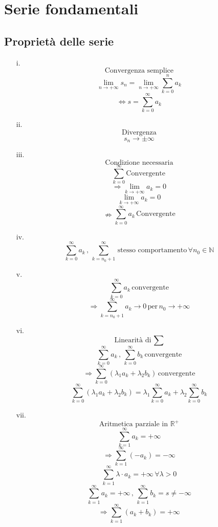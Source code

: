 \documentclass[a4paper,12pt]{report}
\theoremstyle{mystyle}
\begin{document}
\section{Serie fondamentali}

\subsection{Proprietà delle serie}

\begin{enumerate}
    \item[i.] \[\text{Convergenza semplice}\]
        \[\lim_{n \rightarrow +\infty} s_n = \lim_{n \rightarrow +\infty} \sum_{k=0}^n a_k \]
        \[\Leftrightarrow s = \sum_{k=0}^\infty a_k \]

    \item[ii.] \[\text{Divergenza}\]
        \[s_n \rightarrow \pm \infty \]

    \item[iii.] \[\text{Condizione necessaria}\]
        \[\sum_{k=0}^\infty \,\text{Convergente} \]
        \[\Rightarrow \lim_{k \rightarrow +\infty} a_k =0 \]
        \[\lim_{k \rightarrow +\infty} a_k =0 \]
        \[\nRightarrow \sum_{k=0}^\infty a_k \,\text{Convergente}\]

    \item[iv.]
        \[\sum_{k=0}^\infty a_k \,,\, \sum_{k=n_0+1}^\infty \,\text{stesso comportamento}\, \forall n_0 \in \mathbb{N} \]

    \item[v.]
        \[\sum_{k=0}^\infty a_k \, \text{convergente} \]
        \[\Rightarrow \sum_{k=n_0 +1}^\infty a_k \rightarrow 0 \, \text{per}\, n_0 \rightarrow +\infty \]

    \item[vi.] \[\text{Linearità di } \sum \]
        \[\sum_{k=0}^\infty a_k \, , \, \sum_{k=0}^\infty b_k \, \text{convergente} \]
        \[\Rightarrow \sum_{k=0}^\infty (\lambda_1 a_k + \lambda_2 b_k)\, \text{convergente} \]
        \[\sum_{k=0}^\infty (\lambda_1 a_k + \lambda_2 b_k) = \lambda_1 \sum_{k=0}^\infty a_k + \lambda_2 \sum_{k=0}^\infty b_k \]

    \item[vii.] \[\text{Aritmetica parziale in } \mathbb{R}^+ \]
        \[\sum_{k=1}^\infty a_k = +\infty \]
        \[\Rightarrow \sum_{k=1}^\infty (-a_k) = -\infty \]
        \[\sum_{k=1}^\infty \lambda \cdot a_k = +\infty \, \forall \lambda >0 \]
        \[\sum_{k=1}^\infty a_k = +\infty \,,\, \sum_{k=1}^\infty b_k =s \neq -\infty\]
        \[\Rightarrow \sum_{k=1}^\infty (a_k + b_k)=+\infty \]

\end{enumerate}
\end{document}
